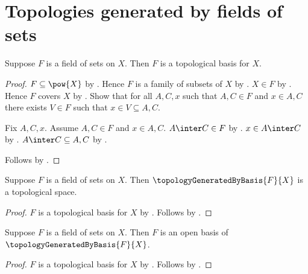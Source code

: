 \section{Topologies generated by fields of sets}








\begin{theorem}\label{field_of_sets_is_topological_basis}
    Suppose $F$ is a field of sets on $X$.
    Then $F$ is a topological basis for $X$.
\end{theorem}
\begin{proof}
    $F\subseteq\pow{X}$ by .
    Hence $F$ is a family of subsets of $X$ by
        .
    $X\in F$ by .
    Hence $F$ covers $X$ by .
    Show that for all $A,C,x$ such that $A,C\in F$ and
        $x\in A,C$ there exists $V\in F$ such that
            $x\in V\subseteq A,C$.
    \begin{subproof}
        Fix $A,C,x$.
        Assume $A,C\in F$ and $x\in A,C$.
        $A\inter C\in F$ by .
        $x\in A\inter C$ by .
        $A\inter C\subseteq A,C$ by
            .
    \end{subproof}
    Follows by .
\end{proof}

\begin{classification}\label{field_generated_topology_is_topological_space}
    Suppose $F$ is a field of sets on $X$.
    Then $\topologyGeneratedByBasis{F}{X}$ is a topological space.
\end{classification}
\begin{proof}
    $F$ is a topological basis for $X$ by
        .
    Follows by
        .
\end{proof}

\begin{theorem}\label{field_of_sets_is_open_basis_of_generated_topology}
    Suppose $F$ is a field of sets on $X$.
    Then $F$ is an open basis of $\topologyGeneratedByBasis{F}{X}$.
\end{theorem}
\begin{proof}
    $F$ is a topological basis for $X$ by
        .
    Follows by .
\end{proof}

